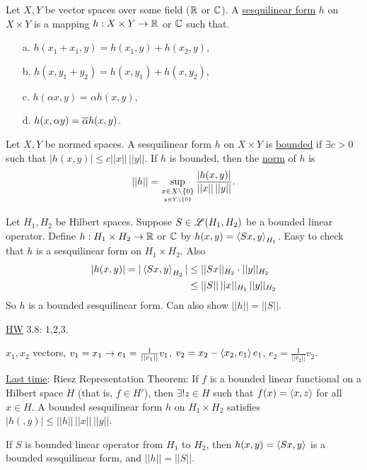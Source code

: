 \documentclass[]{article}
\begin{document}
\begin{definition}
	Let $X,Y$ be vector spaces over some field ($\mathbb{R}$ or $\mathbb{C}$).
	A \ul{sesquilinear form} $h$ on $X\times Y$ is a mapping $h:X\times Y\rightarrow\mathbb{R}$ or $\mathbb{C}$ such that.
	\begin{enumerate}
		\item[a.] $h(x_1+x_1,y) = h(x_1,y)+h(x_2,y)$,
		\item[b.] $h(x,y_1+y_2) = h(x,y_1)+h(x,y_2)$,
		\item[c.] $h(\alpha x,y) = \alpha h(x,y)$,
		\item[d.] $h(x,\alpha y) = \overline{\alpha} h(x,y)$.
	\end{enumerate}
\end{definition}
\begin{definition}
	Let $X,Y$ be normed spaces.
	A sesquilinear form $h$ on $X\times Y$ is \ul{bounded} if $\exists c>0$ such that $|h(x,y)|\leq c||x||\,||y||$.
	If $h$ is bounded, then the \ul{norm} of $h$ is $$||h|| = \sup_{\underset{y\in Y\backslash\left\{ 0 \right\}}{x\in X\backslash\left\{ 0 \right\}}} \frac{|h(x,y)|}{||x||\,||y||}.$$
\end{definition}
\begin{example}
	Let $H_1,H_2$ be Hilbert spaces.
	Suppose $S\in\mathscr{L}(H_1,H_2)$ be a bounded linear operator.
	Define $h:H_1\times H_2\rightarrow\mathbb{R}$ or $\mathbb{C}$ by $h(x,y) = \left\langle Sx,y \right\rangle_{H_1}$.
	Easy to check that $h$ is a sesquilinear form on $H_1\times H_2$. Also
	\begin{align*}
		|h(x,y)| = |\left\langle Sx,y \right\rangle_{H_2}|
				 &\leq ||Sx||_{H_2} \cdot ||y||_{H_2} \\
				 &\leq ||S||\,||x||_{H_1}\,||y||_{H_2}
	\end{align*}
	So $h$ is a bounded sesquilinear form.
	Can also show $||h||=||S||$.
\end{example}

\ul{HW} 3.8: 1,2,3.

\begin{example}
	$x_1,x_2$ vectors,
	$v_1 = x_1 \rightarrow e_1=\frac1{||v_1||}v_1$, 
	$v_2 = x_2-\left\langle x_2,e_1 \right\rangle e_1$, 
	$e_2 = \frac1{||v_2||}v_2$.
\end{example}

\ul{Last time}: Riesz Representation Theorem: If $f$ is a bounded linear functional on a Hilbert space $H$ (that is, $f\in H'$), then $\exists! z\in H$ such that $f(x) = \left\langle x,z \right\rangle$ for all $x\in H$.
A bounded sesquilinear form $h$ on $H_1\times H_2$ satisfies $|h(,y)| \leq ||h||\,||x||\,||y||$.

If $S$ is bounded linear operator from $H_1$ to $H_2$, then $h(x,y) = \left\langle Sx,y \right\rangle$ is a bounded sesquilinear form, and $||h||=||S||$.
\end{document}
